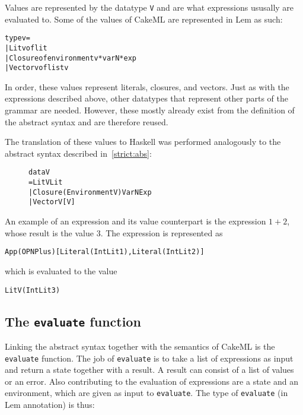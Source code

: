 Values are represented by the datatype \texttt{V} and are what expressions
ususally are evaluated to. Some of the values of CakeML are represented in
Lem as such:

\begin{alltt}
  type v =
    | Litv of lit
    | Closure of environment v * varN * exp
    | Vectorv of list v
\end{alltt}

\noindent In order, these values represent literals, closures, and vectors.
Just as with the expressions described above, other datatypes that represent
other parts of the grammar are needed. However, these mostly already exist from
the definition of the abstract syntax and are therefore reused.

The translation of these values to Haskell was performed analogously to the
abstract syntax described in~\ref{strict:abs}:

\begin{figure}[H]
\begin{alltt}
  data V
    = LitV Lit
    | Closure (Environment V) VarN Exp
    | VectorV [V]
\end{alltt}
\end{figure}

An example of an expression and its value counterpart is the expression $1 + 2$,
whose result is the value 3. The expression is represented as
\begin{alltt}
  App (OPN Plus) [Literal (IntLit 1), Literal (IntLit 2)]
\end{alltt}
which is evaluated to the value
\begin{alltt}
  LitV (IntLit 3)
\end{alltt}


\subsection{The \texttt{evaluate} function}
Linking the abstract syntax together with the semantics of CakeML is the
\texttt{evaluate} function. The job of \texttt{evaluate} is to take a list of
expressions as input and return a state together with a result. A result can
consist of a list of values or an error. Also contributing to the evaluation
of expressions are a state and an environment, which are given as input to
\texttt{evaluate}. The type of \texttt{evaluate} (in Lem annotation) is thus:


